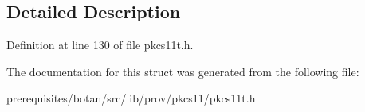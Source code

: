 \subsection{Detailed Description}


Definition at line 130 of file pkcs11t.\+h.



The documentation for this struct was generated from the following file\+:\begin{DoxyCompactItemize}
\item 
prerequisites/botan/src/lib/prov/pkcs11/pkcs11t.\+h\end{DoxyCompactItemize}
